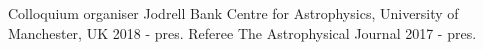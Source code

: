 \begin{cvpress}
   \cvpres
   {Colloquium organiser}
    {Jodrell Bank Centre for Astrophysics, University of Manchester, UK}
    {2018 - pres.}
    \cvpres
   {Referee}
    {The Astrophysical Journal}
    {2017 - pres.}
\end{cvpress}


